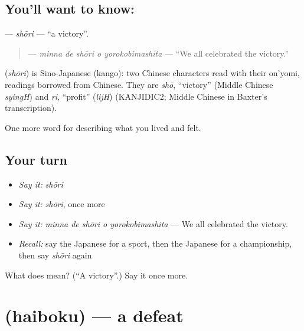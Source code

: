 \subsection*{You'll want to know: }
\textbf{} — \emph{shōri} — \textquotedblleft{}a victory\textquotedblright{}.

\begin{quote}
\textbf{  } — \emph{minna de shōri o yorokobimashita} — \textquotedblleft{}We all celebrated the victory.\textquotedblright{}
\end{quote}

\begin{cousinweb}
\textbf{} (\emph{shōri}) is Sino-Japanese (kango): two Chinese characters read with their on'yomi, readings borrowed from Chinese. They are \emph{shō}, \textquotedblleft{}victory\textquotedblright{} (Middle Chinese \emph{syingH}) and \emph{ri}, \textquotedblleft{}profit\textquotedblright{} (\emph{lijH}) (KANJIDIC2; Middle Chinese in Baxter's transcription).
\end{cousinweb}

\begin{grammarlens}[title={What you've built}]
One more word for describing what you lived and felt.
\end{grammarlens}

\subsection*{Your turn}
\begin{itemize}
\raggedright
  \item \emph{Say it:} \emph{shōri}
  \item \emph{Say it:} \emph{shōri}, once more
  \item \emph{Say it:} \emph{minna de shōri o yorokobimashita} — We all celebrated the victory.
  \item \emph{Recall:} say the Japanese for a sport, then the Japanese for a championship, then say \emph{shōri} again
\end{itemize}

\begin{tcolorbox}[breakable,colback=teal!4,colframe=teal!35!black,title={Before you move on}]
What does  mean? (\textquotedblleft{}A victory\textquotedblright{}.) Say it once more.
\end{tcolorbox}
\section[\texorpdfstring{\ja{はいぼく} (haiboku)}{はいぼく (haiboku)}]{ (haiboku) — a defeat}

